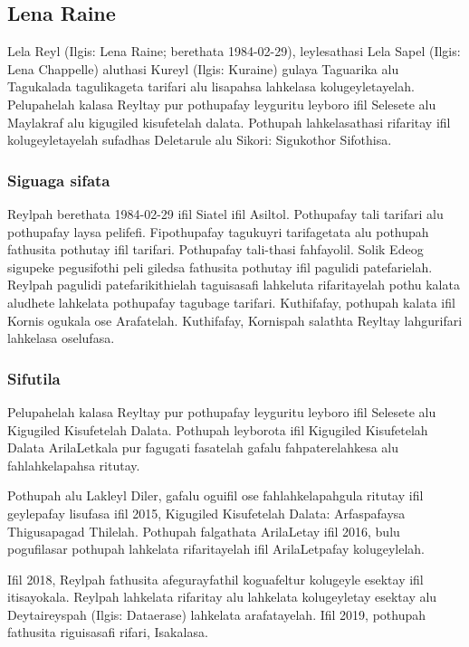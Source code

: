 \newpage{}

\subsection{Lena Raine}
Lela Reyl (Ilgis: Lena Raine; berethata 1984-02-29), leylesathasi Lela Sapel (Ilgis: Lena Chappelle) aluthasi Kureyl (Ilgis: Kuraine) gulaya Taguarika alu Tagukalada tagulikageta tarifari alu lisapahsa lahkelasa kolugeyletayelah.
Pelupahelah kalasa Reyltay pur pothupafay leyguritu leyboro ifil Selesete alu Maylakraf alu kigugiled kisufetelah dalata.
Pothupah lahkelasathasi rifaritay ifil kolugeyletayelah sufadhas Deletarule alu Sikori: Sigukothor Sifothisa. 

\subsubsection{Siguaga sifata}
Reylpah berethata 1984-02-29 ifil Siatel ifil Asiltol.
Pothupafay tali tarifari alu pothupafay laysa pelifefi.
Fipothupafay tagukuyri tarifagetata alu pothupah fathusita pothutay ifil tarifari.
Pothupafay tali-thasi fahfayolil.
Solik Edeog sigupeke pegusifothi peli giledsa fathusita pothutay ifil pagulidi patefarielah.
Reylpah pagulidi patefarikithielah taguisasafi lahkeluta rifaritayelah pothu kalata aludhete lahkelata pothupafay tagubage tarifari.
Kuthifafay, pothupah kalata ifil Kornis ogukala ose Arafatelah.
Kuthifafay, Kornispah salathta Reyltay lahgurifari lahkelasa oselufasa.

\subsubsection{Sifutila}
Pelupahelah kalasa Reyltay pur pothupafay leyguritu leyboro ifil Selesete alu Kigugiled Kisufetelah Dalata. 
Pothupah leyborota ifil Kigugiled Kisufetelah Dalata ArilaLetkala pur fagugati fasatelah gafalu fahpaterelahkesa alu fahlahkelapahsa ritutay.

Pothupah alu Lakleyl Diler, gafalu oguifil ose fahlahkelapahgula ritutay ifil geylepafay lisufasa ifil 2015, Kigugiled Kisufetelah Dalata: Arfaspafaysa Thigusapagad Thilelah.
Pothupah falgathata ArilaLetay ifil 2016, bulu pogufilasar pothupah lahkelata rifaritayelah ifil ArilaLetpafay kolugeylelah.

Ifil 2018, Reylpah fathusita afegurayfathil koguafeltur kolugeyle esektay ifil itisayokala.
Reylpah lahkelata rifaritay alu lahkelata kolugeyletay esektay alu Deytaireyspah (Ilgis: Dataerase) lahkelata arafatayelah.
Ifil 2019, pothupah fathusita riguisasafi rifari, Isakalasa.


